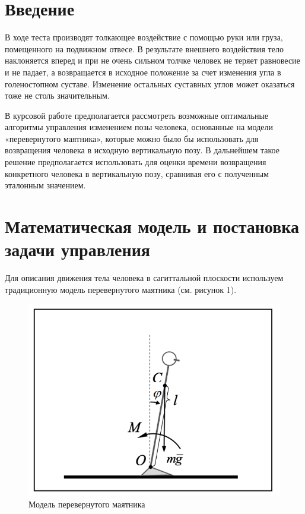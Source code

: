 \documentclass[a4paper,14pt]{article}
\theoremstyle{plain} %
\theoremstyle{definition} %
\theoremstyle{remark} %
\begin{document}
\thispagestyle{empty} %
\normalsize{
\newpage
\tableofcontents
\newpage

\section{Введение}
В ходе теста производят толкающее воздействие с помощью руки или
груза, помещенного на подвижном отвесе. В результате внешнего
воздействия тело наклоняется вперед и при не очень сильном толчке
человек не теряет равновесие и не падает, а возвращается в исходное
положение за счет изменения угла в голеностопном суставе. Изменение
остальных суставных углов может оказаться тоже не столь значительным.

В курсовой работе предполагается рассмотреть возможные оптимальные
алгоритмы управления изменением позы человека, основанные на модели
«перевернутого маятника», которые можно было бы использовать для
возвращения человека в исходную вертикальную позу. В дальнейшем
такое решение предполагается использовать для оценки времени
возвращения конкретного человека в вертикальную позу, сравнивая
его с полученным эталонным значением.
\newpage
\section{Математическая модель и постановка задачи управления}
Для описания движения тела человека в сагиттальной плоскости используем традиционную модель перевернутого маятника (см. рисунок 1).

\begin{figure}[h!]
    \centering
    \includegraphics[width=1.00\linewidth]{pendulum.png}
    \caption{Модель перевернутого маятника}
    \label{fig:pendulum}
\end{figure}

}
\end{document}

